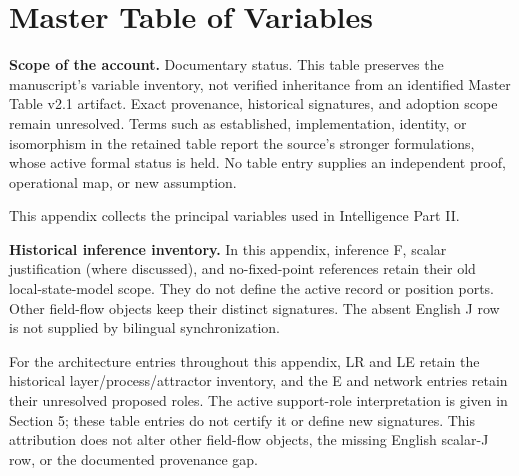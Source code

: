 \section{Master Table of Variables}

\noindent\textbf{Scope of the account.} Documentary status. This table preserves the manuscript's variable inventory, not verified inheritance from an identified Master Table v2.1 artifact. Exact provenance, historical signatures, and adoption scope remain unresolved. Terms such as established, implementation, identity, or isomorphism in the retained table report the source's stronger formulations, whose active formal status is held. No table entry supplies an independent proof, operational map, or new assumption.


This appendix collects the principal variables used in Intelligence Part II.

\noindent\textbf{Historical inference inventory.} In this appendix, inference F, scalar justification (where discussed), and no-fixed-point references retain their old local-state-model scope. They do not define the active record or position ports. Other field-flow objects keep their distinct signatures. The absent English J row is not supplied by bilingual synchronization.

For the architecture entries throughout this appendix, LR and LE retain the historical layer/process/attractor inventory, and the E and network entries retain their unresolved proposed roles. The active support-role interpretation is given in Section 5; these table entries do not certify it or define new signatures. This attribution does not alter other field-flow objects, the missing English scalar-J row, or the documented provenance gap.


